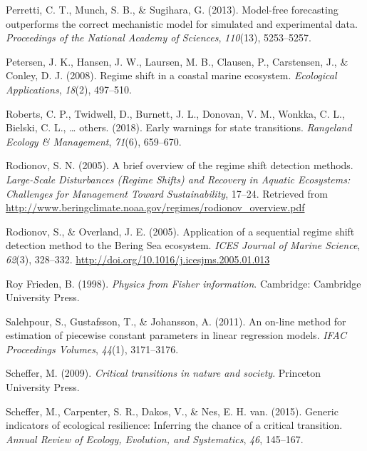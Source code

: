 \documentclass[12pt,twoside,openany]{reedthesis}
\begin{document}
\hypertarget{ref-perretti_model-free_2013}{}
Perretti, C. T., Munch, S. B., \& Sugihara, G. (2013). Model-free
forecasting outperforms the correct mechanistic model for simulated and
experimental data. \emph{Proceedings of the National Academy of
Sciences}, \emph{110}(13), 5253--5257.

\hypertarget{ref-petersen2008regime}{}
Petersen, J. K., Hansen, J. W., Laursen, M. B., Clausen, P., Carstensen,
J., \& Conley, D. J. (2008). Regime shift in a coastal marine ecosystem.
\emph{Ecological Applications}, \emph{18}(2), 497--510.

\hypertarget{ref-roberts2018early}{}
Roberts, C. P., Twidwell, D., Burnett, J. L., Donovan, V. M., Wonkka, C.
L., Bielski, C. L., \ldots{} others. (2018). Early warnings for state
transitions. \emph{Rangeland Ecology \& Management}, \emph{71}(6),
659--670.

\hypertarget{ref-rodionov_brief_2005}{}
Rodionov, S. N. (2005). A brief overview of the regime shift detection
methods. \emph{Large-Scale Disturbances (Regime Shifts) and Recovery in
Aquatic Ecosystems: Challenges for Management Toward Sustainability},
17--24. Retrieved from
\url{http://www.beringclimate.noaa.gov/regimes/rodionov_overview.pdf}

\hypertarget{ref-rodionov_application_2005}{}
Rodionov, S., \& Overland, J. E. (2005). Application of a sequential
regime shift detection method to the Bering Sea ecosystem. \emph{ICES
Journal of Marine Science}, \emph{62}(3), 328--332.
\url{http://doi.org/10.1016/j.icesjms.2005.01.013}

\hypertarget{ref-roy_frieden_physics_1998}{}
Roy Frieden, B. (1998). \emph{Physics from Fisher information}.
Cambridge: Cambridge University Press.

\hypertarget{ref-salehpour2011line}{}
Salehpour, S., Gustafsson, T., \& Johansson, A. (2011). An on-line
method for estimation of piecewise constant parameters in linear
regression models. \emph{IFAC Proceedings Volumes}, \emph{44}(1),
3171--3176.

\hypertarget{ref-scheffer_critical_2009}{}
Scheffer, M. (2009). \emph{Critical transitions in nature and society}.
Princeton University Press.

\hypertarget{ref-scheffer2015generic}{}
Scheffer, M., Carpenter, S. R., Dakos, V., \& Nes, E. H. van. (2015).
Generic indicators of ecological resilience: Inferring the chance of a
critical transition. \emph{Annual Review of Ecology, Evolution, and
Systematics}, \emph{46}, 145--167.
\end{document}

